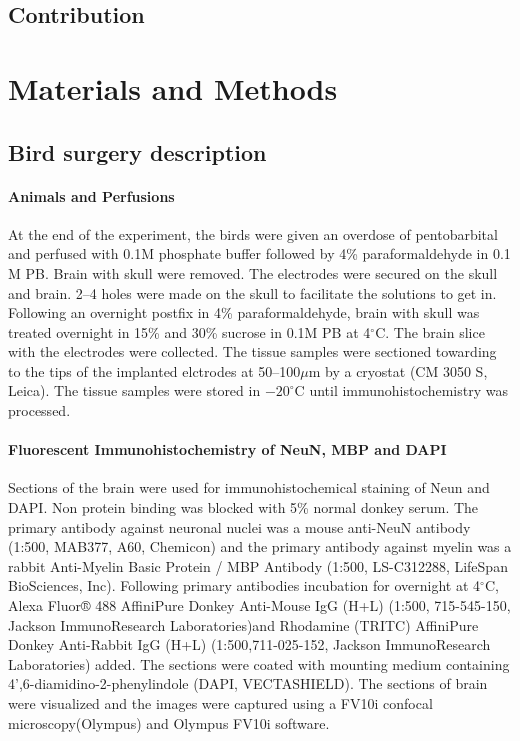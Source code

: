 \documentclass[10pt,letterpaper]{article}
\renewcommand{\subsubsection}[1]{\paragraph{#1}}
\begin{document}
\subsection{Contribution}



\section{Materials and Methods}

\subsection{Bird surgery description}

\subsubsection{Animals and Perfusions}

At the end of the experiment, the birds were given an overdose of
pentobarbital and perfused with 0.1M phosphate buffer followed by 4\%
paraformaldehyde in 0.1 M PB.  Brain with skull were removed. The
electrodes were secured on the skull and brain. 2--4 holes were made
on the skull to facilitate the solutions to get in. Following an
overnight postfix in 4\% paraformaldehyde, brain with skull was
treated overnight in 15\% and 30\% sucrose in 0.1M PB at 4$^\circ$C.
The brain slice with the electrodes were collected. The tissue samples
were sectioned towarding to the tips of the implanted elctrodes at
50--100$\mu$m by a cryostat (CM 3050 S, Leica). The tissue samples
were stored in $-20^\circ$C until immunohistochemistry was processed.

\subsubsection{Fluorescent Immunohistochemistry of NeuN, MBP and DAPI}

Sections of the brain were used for immunohistochemical staining of
Neun and DAPI. Non protein binding was blocked with 5\% normal donkey
serum. The primary antibody against neuronal nuclei was a mouse
anti-NeuN antibody (1:500, MAB377, A60, Chemicon) and the primary
antibody against myelin was a rabbit Anti-Myelin Basic Protein / MBP
Antibody (1:500, LS-C312288, LifeSpan BioSciences, Inc). Following
primary antibodies incubation for overnight at 4$^\circ$C, Alexa
Fluor® 488 AffiniPure Donkey Anti-Mouse IgG (H+L) (1:500, 715-545-150,
Jackson ImmunoResearch Laboratories)and Rhodamine (TRITC) AffiniPure
Donkey Anti-Rabbit IgG (H+L) (1:500,711-025-152, Jackson
ImmunoResearch Laboratories) added. The sections were coated with
mounting medium containing 4',6-diamidino-2-phenylindole (DAPI,
VECTASHIELD).  The sections of brain were visualized and the images
were captured using a FV10i confocal microscopy(Olympus) and Olympus
FV10i software.
\end{document}
